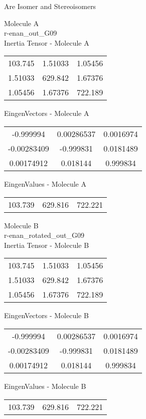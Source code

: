 \begin{center}
\vtab
\vtab
\textcolor{NavyBlue}{\Large Are Isomer and Stereoisomers}
\end{center}
\newpage
\begin{multicols}{2}
\begin{center}
Molecule A \\ 
r-enan\_out\_G09
\\
Inertia Tensor - Molecule A \\
\vtab
\begin{tabular}{|c c c|}
103.745	 & 	1.51033	 & 	1.05456	 \\
1.51033	 & 	629.842	 & 	1.67376	 \\
1.05456	 & 	1.67376	 & 	722.189
\end{tabular}

\vtab
 EingenVectors - Molecule A     \\
\vtab
\begin{tabular}{|c c c|}
-0.999994	 & 	0.00286537	 & 	0.0016974	 \\
-0.00283409	 & 	-0.999831	 & 	0.0181489	 \\
0.00174912	 & 	0.018144	 & 	0.999834
\end{tabular}

\vtab
 EingenValues - Molecule A     \\
\vtab
\begin{tabular}{|c c c|}
103.739	 & 	629.816	 & 	722.221
\end{tabular}
\columnbreak

Molecule B \\ 
r-enan\_rotated\_out\_G09
\\
Inertia Tensor - Molecule B \\
\vtab
\begin{tabular}{|c c c|}
103.745	 & 	1.51033	 & 	1.05456	 \\
1.51033	 & 	629.842	 & 	1.67376	 \\
1.05456	 & 	1.67376	 & 	722.189
\end{tabular}

\vtab
 EingenVectors - Molecule B     \\
\vtab
\begin{tabular}{|c c c|}
-0.999994	 & 	0.00286537	 & 	0.0016974	 \\
-0.00283409	 & 	-0.999831	 & 	0.0181489	 \\
0.00174912	 & 	0.018144	 & 	0.999834
\end{tabular}

\vtab
 EingenValues - Molecule B     \\
\vtab
\begin{tabular}{|c c c|}
103.739	 & 	629.816	 & 	722.221
\end{tabular}

\end{center}
\end{multicols}
